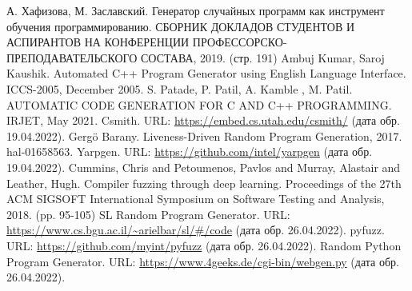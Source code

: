 \documentclass[a4paper,article,14pt]{extarticle}
\begin{document}


\tableofcontents
\pagebreak

















\begin{thebibliography}{1}
     А. Хафизова, М. Заславский. Генератор случайных программ как инструмент обучения программированию. СБОРНИК ДОКЛАДОВ СТУДЕНТОВ И АСПИРАНТОВ НА КОНФЕРЕНЦИИ ПРОФЕССОРСКО-ПРЕПОДАВАТЕЛЬСКОГО СОСТАВА, 2019. (стр. 191)
     Ambuj Kumar, Saroj Kaushik. Automated C++ Program Generator using English Language Interface. ICCS-2005, December 2005.
     S. Patade, P. Patil, A. Kamble , M. Patil. AUTOMATIC CODE GENERATION FOR C AND C++ PROGRAMMING. IRJET, May 2021.
     Csmith. URL: \url{https://embed.cs.utah.edu/csmith/} (дата обр. 19.04.2022).
     Gergö Barany. Liveness-Driven Random Program Generation, 2017. hal-01658563.
     Yarpgen. URL: \url{https://github.com/intel/yarpgen} (дата обр. 19.04.2022).
     Cummins, Chris and Petoumenos, Pavlos and Murray, Alastair and Leather, Hugh.
    Compiler fuzzing through deep learning.
    Proceedings of the 27th ACM SIGSOFT International Symposium on Software Testing and Analysis, 2018. (pp. 95-105)
     SL Random Program Generator. URL:
    \url{https://www.cs.bgu.ac.il/~arielbar/sl/#/code} (дата обр. 26.04.2022).
     pyfuzz. URL: \url{https://github.com/myint/pyfuzz} (дата обр. 26.04.2022). 
     Random Python Program Generator. URL: \url{https://www.4geeks.de/cgi-bin/webgen.py} 
    (дата обр. 26.04.2022).
\end{thebibliography}
\end{document}
